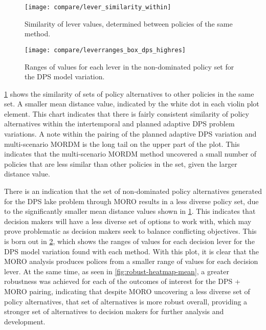     \begin{figure}[ht]
        \centering
        \captionsetup{width=0.9\textwidth}

        \texttt{[image: compare/lever\_similarity\_within]}
        
        \caption{Similarity of lever values, determined between policies of the same method.}
        \label{fig:lever-similarity}
    \end{figure}
    
    \begin{figure}[ht]
        \centering
        \captionsetup{width=\textwidth}
        
        \texttt{[image: compare/leverranges\_box\_dps\_highres]}
        \caption{Ranges of values for each lever in the non-dominated policy set for the DPS model variation.}
        \label{fig:dps-lever-variation}
    \end{figure}

    \cref{fig:lever-similarity} shows the similarity of sets of policy alternatives to other policies in the same set. A smaller mean distance value, indicated by the white dot in each violin plot element. This chart indicates that there is fairly consistent similarity of policy alternatives within the intertemporal and planned adaptive DPS problem variations. A note within the pairing of the planned adaptive DPS variation and multi-scenario MORDM is the long tail on the upper part of the plot. This indicates that the multi-scenario MORDM method uncovered a small number of policies that are less similar than other policies in the set, given the larger distance value.

    There is an indication that the set of non-dominated policy alternatives generated for the DPS lake problem through MORO results in a less diverse policy set, due to the significantly smaller mean distance values shown in \cref{fig:lever-similarity}. This indicates that decision makers will have a less diverse set of options to work with, which may prove problematic as decision makers seek to balance conflicting objectives. This is born out in \cref{fig:dps-lever-variation}, which shows the ranges of values for each decision lever for the DPS model variation found with each method. With this plot, it is clear that the MORO analysis produces polices from a smaller range of values for each decision lever. At the same time, as seen in \cref{fig:robust-heatmap-mean}, a greater robustness was achieved for each of the outcomes of interest for the DPS + MORO pairing, indicating that despite MORO uncovering a less diverse set of policy alternatives, that set of alternatives is more robust overall, providing a stronger set of alternatives to decision makers for further analysis and development. 
    

